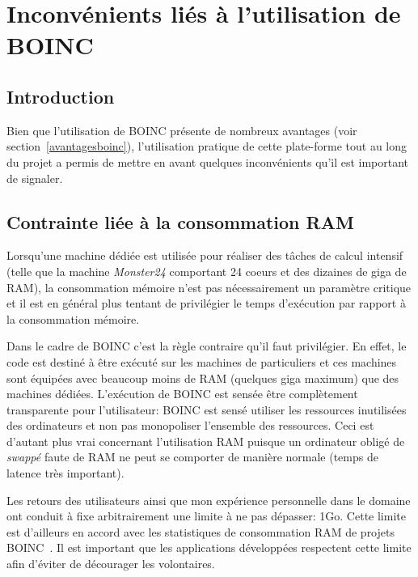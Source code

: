 \documentclass[a4paper, 11pt]{report}
\begin{document}
\section{Inconvénients liés à l'utilisation de \textsc{BOINC}}
\subsection{Introduction}
Bien que l'utilisation de \textsc{BOINC} présente de nombreux avantages (voir section~\ref{avantagesboinc}), l'utilisation pratique de cette plate-forme tout au long du projet a permis de mettre en avant quelques inconvénients qu'il est important de signaler.

\subsection{Contrainte liée à la consommation RAM}
Lorsqu'une machine dédiée est utilisée pour réaliser des tâches de calcul intensif (telle que la machine \textit{Monster24} comportant 24 coeurs et des dizaines de giga de RAM), la consommation mémoire n'est pas nécessairement un paramètre critique et il est en général plus tentant de privilégier le temps d'exécution par rapport à la consommation mémoire. 

Dans le cadre de \textsc{BOINC} c'est la règle contraire qu'il faut privilégier. En effet, le code est destiné à être exécuté sur les machines de particuliers et ces machines sont équipées avec beaucoup moins de RAM (quelques giga maximum) que des machines dédiées. L'exécution de \textsc{BOINC} est sensée être complètement transparente pour l'utilisateur: \textsc{BOINC} est sensé utiliser les ressources inutilisées des ordinateurs et non pas monopoliser l'ensemble des ressources. Ceci est d'autant plus vrai concernant l'utilisation RAM puisque un ordinateur obligé de \textit{swappé} faute de RAM ne peut se comporter de manière normale (temps de latence très important).

Les retours des utilisateurs ainsi que mon expérience personnelle dans le domaine ont conduit à fixe arbitrairement une limite à ne pas dépasser: 1Go. Cette limite est d'ailleurs en accord avec les statistiques de consommation RAM de projets \textsc{BOINC}~\cite{WUPROP}. Il est important que les applications développées respectent cette limite afin d'éviter de décourager les volontaires. 
\end{document}
